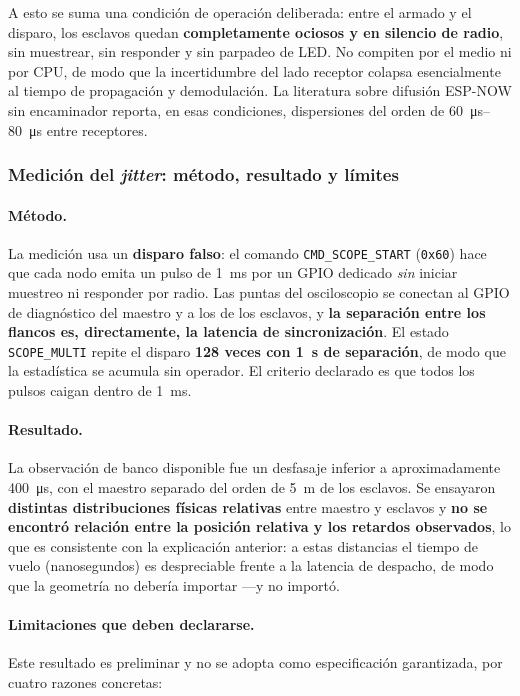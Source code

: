 A esto se suma una condici\'on de operaci\'on deliberada: entre el armado y el disparo,
los esclavos quedan \textbf{completamente ociosos y en silencio de radio}, sin muestrear,
sin responder y sin parpadeo de LED. No compiten por el medio ni por CPU, de modo que la
incertidumbre del lado receptor colapsa esencialmente al tiempo de propagaci\'on y
demodulaci\'on. La literatura sobre difusi\'on ESP-NOW sin encaminador reporta, en esas
condiciones, dispersiones del orden de \SIrange{60}{80}{\micro\second} entre receptores.

\subsubsection{Medici\'on del \emph{jitter}: m\'etodo, resultado y l\'imites}

\paragraph{M\'etodo.} La medici\'on usa un \textbf{disparo falso}: el comando
\texttt{CMD\_SCOPE\_START} (\texttt{0x60}) hace que cada nodo emita un pulso de
\SI{1}{\milli\second} por un GPIO dedicado \emph{sin} iniciar muestreo ni responder por
radio. Las puntas del osciloscopio se conectan al GPIO de diagn\'ostico del maestro y a
los de los esclavos, y \textbf{la separaci\'on entre los flancos es, directamente, la
latencia de sincronizaci\'on}. El estado \texttt{SCOPE\_MULTI} repite el disparo
\textbf{128 veces con \SI{1}{\second} de separaci\'on}, de modo que la estad\'istica se
acumula sin operador. El criterio declarado es que todos los pulsos caigan dentro de
\SI{1}{\milli\second}.

\paragraph{Resultado.} La observaci\'on de banco disponible fue un desfasaje inferior a
aproximadamente \SI{400}{\micro\second}, con el maestro separado del orden de
\SI{5}{\meter} de los esclavos. Se ensayaron \textbf{distintas distribuciones f\'isicas
relativas} entre maestro y esclavos y \textbf{no se encontr\'o relaci\'on entre la
posici\'on relativa y los retardos observados}, lo que es consistente con la explicaci\'on
anterior: a estas distancias el tiempo de vuelo (nanosegundos) es despreciable frente a
la latencia de despacho, de modo que la geometr\'ia no deber\'ia importar ---y no
import\'o.

\paragraph{Limitaciones que deben declararse.} Este resultado es preliminar y no se
adopta como especificaci\'on garantizada, por cuatro razones concretas:

